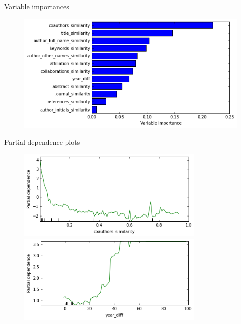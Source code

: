 \documentclass{beamer}
\begin{document}

\begin{frame}{Variable importances}
\begin{figure}
\includegraphics[width=\textwidth]{./figures/imp.png}
\end{figure}
\end{frame}



\begin{frame}{Partial dependence plots}
\begin{figure}
\includegraphics[width=0.8\textwidth]{./figures/coauthors.png}\\
\includegraphics[width=0.8\textwidth]{./figures/yeardiff.png}
\end{figure}
\end{frame}
\end{document}
